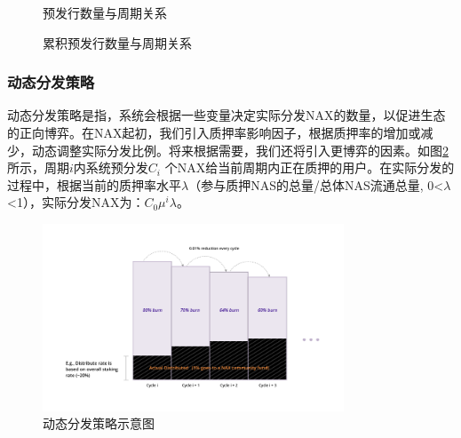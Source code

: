 \begin{figure}[h]
\centering
\begin{minipage}[5cm]{.45\textwidth}
\centering
\caption{预发行数量与周期关系}\label{dist}

\vspace{\baselineskip}
\end{minipage}\qquad
\begin{minipage}[5cm]{.45\textwidth}
\centering
\caption{累积预发行数量与周期关系}\label{acc}
\end{minipage}
\end{figure}

\subsubsection{动态分发策略}
动态分发策略是指，系统会根据一些变量决定实际分发NAX的数量，以促进生态的正向博弈。在NAX起初，我们引入质押率影响因子，根据质押率的增加或减少，动态调整实际分发比例。将来根据需要，我们还将引入更博弈的因素。如图\ref{fig:dynamic_dist}所示，周期$i$内系统预分发$C_i$ 个NAX给当前周期内正在质押的用户。在实际分发的过程中，根据当前的质押率水平$\lambda$（参与质押NAS的总量/总体NAS流通总量, 0<$\lambda$<1），实际分发NAX为：$C_0 \mu^i\lambda$。

\begin{figure}[h]
  \centering
  \includegraphics[width=0.8\textwidth]{../common/dynamic_dist.pdf}
  \caption{动态分发策略示意图 \label{fig:dynamic_dist}}
\end{figure}


